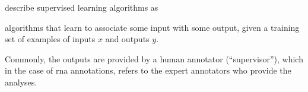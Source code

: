 


\textcite{goodfellow2016deep} describe supervised learning
algorithms as

\begin{italicquotes}
    algorithms that learn to associate some input with some
    output, given a training set of examples of inputs $x$
    and outputs $y$.
\end{italicquotes}

Commonly, the outputs are provided by a human annotator
(``supervisor''), which in the case of \gls{rna}
annotations, refers to the expert annotators who provide the
analyses.
